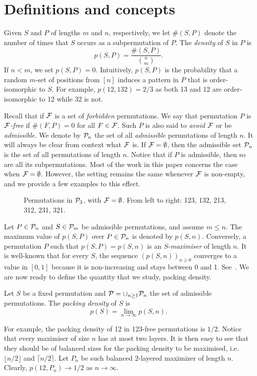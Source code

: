 \section{Definitions and concepts}
\label{sec:defs}

Given $S$ and $P$ of lengths $m$ and $n$, respectively, we let $\#(S, P)$ denote the number of times that $S$ occurs as a subpermutation of $P$. The \emph{density} of $S$ in $P$ is $$p(S,P) = \frac{\#(S,P)}{\binom{n}{m}}.$$ If $n < m$, we set $p(S,P) = 0$. Intuitively, $p(S,P)$ is the probability that a random $m$-set of positions from $[n]$ induces a pattern in $P$ that is order-isomorphic to $S$. For example, $p(12, 132) = 2/3$ as both 13 and 12 are order-isomorphic to 12 while 32 is not.

Recall that if $\F$ is a set of \emph{forbidden} permutations. We say that permutation $P$ is \emph{$\F$-free} if $\#(F,P) = 0$ for all $F \in \F$. Such $P$ is also said to \emph{avoid} $\F$ or be \emph{admissible}. We denote by $\P_n$ the set of all \emph{admissible} permutations of length $n$. It will always be clear from context what $\F$ is. If $\F = \emptyset$, then the admissible set $\P_n$ is the set of all permutations of length $n$. Notice that if $P$ is admissible, then so are all its subpermutations. Most of the work in this paper concerns the case when $\F = \emptyset$. However, the setting remains the same whenever $\F$ is non-empty, and we provide a few examples to this effect. 

\begin{figure}[ht]
\centering
{}
\caption{\small Permutations in $\P_3$, with $\F = \emptyset$. From left to right: 123, 132, 213, 312, 231, 321.}
\label{fig:exP3}
\end{figure}
Let $P \in \P_n$ and $S \in \P_m$ be admissible permutations, and assume $m \leq n$. The maximum value of $p(S,P)$ over $P \in \P_n$ is denoted by $p(S,n)$. Conversely, a permutation $P$ such that $p(S,P) = p(S,n)$ is an $S$-\emph{maximiser} of length $n$. It is well-known that for every $S$, the sequence $\left(p(S,n)\right)_{n\geq 0}$ converges to a value in $[0,1]$ because it is non-increasing and stays between 0 and 1. See~\cite{katona1964exists}. We are now ready to define the quantity that we study, packing density.

\begin{definition}
Let $S$ be a fixed permutation and $\P = \cup_{n\geq 1}\P_n$ the set of admissible permutations. The \emph{packing density} of $S$ is
$$p(S) = \lim_{n\to\infty}p(S,n).$$
\end{definition}
For example, the packing density of 12 in 123-free permutations is $1/2$. Notice that every maximiser of size $n$ has at most two layers. It is then easy to see that they should be of balanced sizes for the packing density to be maximised, i.e.~$\lfloor n/2 \rfloor$ and $\lceil n/2 \rceil$. Let $P_n$ be such balanced 2-layered maximizer of length $n$. Clearly, $p(12, P_n) \to 1/2$ as $n\to\infty$. 

